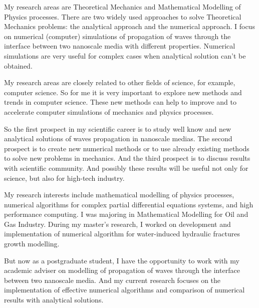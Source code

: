 \documentclass[main.tex]{subfiles}
\begin{document}
\setcounter{secnumdepth}{0}


\setcounter{section}{102}


\setcounter{subsection}{1}

My research areas are Theoretical Mechanics and Mathematical Modelling of Physics processes.
There are two widely used approaches to solve Theoretical Mechanics problems: the analytical approach and the numerical approach.
I focus on numerical (computer) simulations of propagation of waves through the interface between two nanoscale media with different properties.
Numerical simulations are very useful for complex cases when analytical solution can't be obtained.

My research areas are closely related to other fields of science, for example, computer science.
So for me it is very important to explore new methods and trends in computer science.
These new methods can help to improve and to accelerate computer simulations of mechanics and physics processes.

So the first prospect in my scientific career is to study well know and new analytical solutions of waves propagation in nanoscale medias.
The second prospect is to create new numerical methods or to use already existing methods to solve new problems in mechanics.
And the third prospect is to discuss results with scientific community.
And possibly these results will be useful not only for science, but also for high-tech industry.
\\


\newpage


\setcounter{subsection}{2}

My research interests include mathematical modelling of physics processes, numerical algorithms for complex partial differential equations systems, and high performance computing.
I was majoring in Mathematical Modelling for Oil and Gas Industry.
During my master's research, I worked on development and implementation of numerical algorithm for water-induced hydraulic fractures growth modelling.

But now as a postgraduate student, I have the opportunity to work with my academic adviser on modelling of propagation of waves through the interface between two nanoscale media.
And my current research focuses on the implementation of effective numerical algorithms and comparison of numerical results with analytical solutions.
\end{document}
